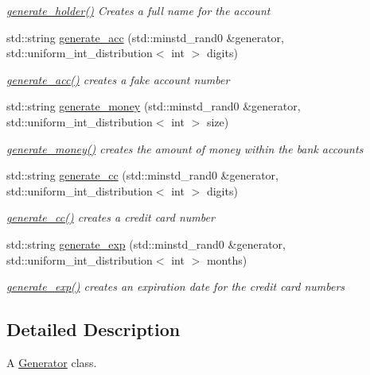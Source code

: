 \begin{DoxyCompactItemize}
\begin{DoxyCompactList}\small\item\em \hyperlink{class_generator_a9ad03b3204c0809c70c0c496c84a4cb0}{generate\+\_\+holder()} Creates a full name for the account \end{DoxyCompactList}\item 
std\+::string \hyperlink{class_generator_a7d63f70a9e8ef7c2f99498318bcf558d}{generate\+\_\+acc} (std\+::minstd\+\_\+rand0 \&generator, std\+::uniform\+\_\+int\+\_\+distribution$<$ int $>$ digits)
\begin{DoxyCompactList}\small\item\em \hyperlink{class_generator_a7d63f70a9e8ef7c2f99498318bcf558d}{generate\+\_\+acc()} creates a fake account number \end{DoxyCompactList}\item 
std\+::string \hyperlink{class_generator_ac2682698e6e1ef7cc7f4b2c7dd11482b}{generate\+\_\+money} (std\+::minstd\+\_\+rand0 \&generator, std\+::uniform\+\_\+int\+\_\+distribution$<$ int $>$ size)
\begin{DoxyCompactList}\small\item\em \hyperlink{class_generator_ac2682698e6e1ef7cc7f4b2c7dd11482b}{generate\+\_\+money()} creates the amount of money within the bank accounts \end{DoxyCompactList}\item 
std\+::string \hyperlink{class_generator_a16404b548c308334e1502619449d4f23}{generate\+\_\+cc} (std\+::minstd\+\_\+rand0 \&generator, std\+::uniform\+\_\+int\+\_\+distribution$<$ int $>$ digits)
\begin{DoxyCompactList}\small\item\em \hyperlink{class_generator_a16404b548c308334e1502619449d4f23}{generate\+\_\+cc()} creates a credit card number \end{DoxyCompactList}\item 
std\+::string \hyperlink{class_generator_a443048cb6d0a5f29867133c13332a268}{generate\+\_\+exp} (std\+::minstd\+\_\+rand0 \&generator, std\+::uniform\+\_\+int\+\_\+distribution$<$ int $>$ months)
\begin{DoxyCompactList}\small\item\em \hyperlink{class_generator_a443048cb6d0a5f29867133c13332a268}{generate\+\_\+exp()} creates an expiration date for the credit card numbers \end{DoxyCompactList}\end{DoxyCompactItemize}


\subsection{Detailed Description}
A \hyperlink{class_generator}{Generator} class. 

